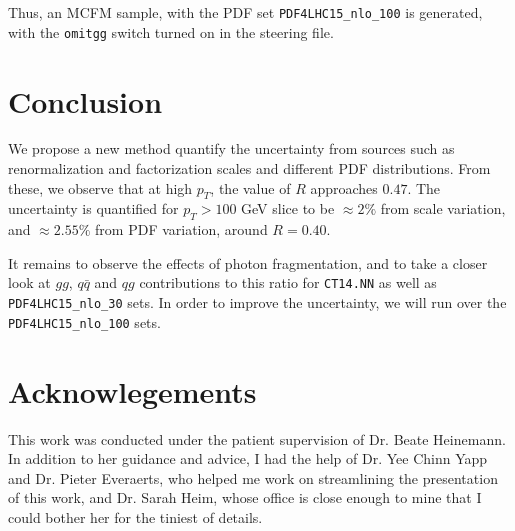 \documentclass[11pt,a4paper,final]{report}
\begin{document}
Thus, an MCFM sample, with the PDF set \texttt{PDF4LHC15\_nlo\_100} is generated, with the \texttt{omitgg} switch turned on in the steering file.

\section{Conclusion}
We propose a new method quantify the uncertainty from sources such as renormalization and factorization scales and different PDF distributions. From these, we observe that at high $p_T$, the value of $R$ approaches $0.47$. The uncertainty is quantified for $p_T > 100$ GeV slice to be $\approx 2\%$ from scale variation, and $\approx 2.55\%$ from PDF variation, around $R = 0.40$.

It remains to observe the effects of photon fragmentation, and to take a closer look at $gg$, $q\bar{q}$ and $qg$ contributions to this ratio for \texttt{CT14.NN} as well as \texttt{PDF4LHC15\_nlo\_30} sets. In order to improve the uncertainty, we will run over the \texttt{PDF4LHC15\_nlo\_100} sets.

\section*{Acknowlegements}
This work was conducted under the patient supervision of Dr. Beate Heinemann. In addition to her guidance and advice, I had the help of Dr. Yee Chinn Yapp and Dr. Pieter Everaerts, who helped me work on streamlining the presentation of this work, and Dr. Sarah Heim, whose office is close enough to mine that I could bother her for the tiniest of details.
\end{document}
